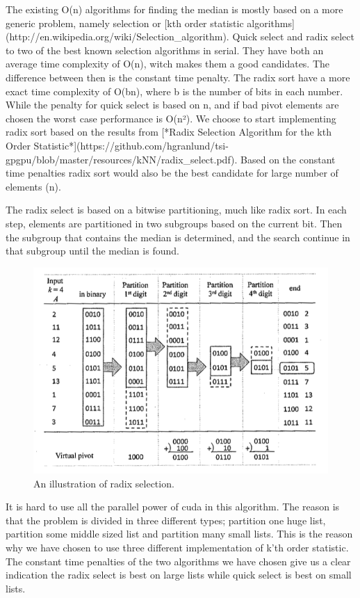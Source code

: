 \begin{enumerate}
\begin{enumerate}
The existing O(n) algorithms for finding the median is mostly based on a more generic problem, namely selection or [kth order statistic algorithms](http://en.wikipedia.org/wiki/Selection_algorithm). Quick select and radix select to two of the best known selection algorithms in serial. They have both an average time complexity of O(n), witch makes them a good candidates. The difference between then is the constant time penalty. The radix sort have a more exact time complexity of O(bn), where b is the number of bits in each number. While the penalty for quick select is based on n, and if bad pivot elements are chosen the worst case performance is O(n²). We choose to start implementing radix sort based on the results from [*Radix Selection Algorithm for the kth Order Statistic*](https://github.com/hgranlund/tsi-gpgpu/blob/master/resources/kNN/radix_select.pdf). Based on the constant time penalties radix sort would also be the best candidate for large number of elements (n).

The radix select is based on a bitwise partitioning, much like radix sort. In each step, elements are partitioned in two subgroups based on the current bit. Then the subgroup that contains the median is determined, and the search continue in that subgroup until the median is found.

\begin{figure}[ht!]
\centering
\includegraphics[width=120mm]{gfx/Radix_select.png}

\caption{An illustration of radix selection.}
\label{fig:radix_select}
\end{figure}

It is hard to use all the parallel power of cuda in this algorithm. The reason is that the problem is divided in three different types; partition one huge list, partition some middle sized list and partition many small lists. This is the reason why we have chosen to use three different implementation of k'th order statistic. The constant time penalties of the two algorithms we have chosen give us a clear indication the radix select is best on large lists while quick select is best on small lists.


\end{enumerate}
\end{enumerate}
